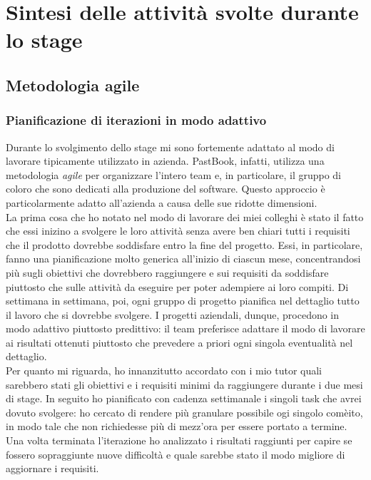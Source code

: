 \chapter{Sintesi delle attività svolte durante lo stage}
	\section{Metodologia agile}
		\subsection{Pianificazione di iterazioni in modo adattivo}
			Durante lo svolgimento dello stage mi sono fortemente adattato al modo di lavorare tipicamente utilizzato in azienda.
			PastBook, infatti, utilizza una metodologia \emph{agile} per organizzare l'intero team e, in particolare, il gruppo di coloro
			che sono dedicati alla produzione del software. Questo approccio è particolarmente adatto all'azienda a causa delle sue
			ridotte dimensioni.\\
			La prima cosa che ho notato nel modo di lavorare dei miei colleghi è stato il fatto che essi inizino a svolgere le loro
			attività senza avere ben chiari tutti i requisiti che il prodotto dovrebbe soddisfare entro la fine del progetto.
			Essi, in particolare, fanno una pianificazione molto generica all'inizio di ciascun mese, concentrandosi più sugli
			obiettivi che dovrebbero raggiungere e sui requisiti da soddisfare piuttosto che sulle attività da eseguire per poter
			adempiere ai loro compiti. Di settimana in settimana, poi, ogni gruppo di progetto pianifica nel dettaglio tutto il lavoro
			che si dovrebbe svolgere. I progetti aziendali, dunque, procedono in modo adattivo piuttosto predittivo: il team preferisce
			adattare il modo di lavorare ai risultati ottenuti piuttosto che prevedere a priori ogni singola eventualità nel dettaglio.\\
			Per quanto mi riguarda, ho innanzitutto accordato con i mio tutor quali sarebbero stati gli obiettivi e i requisiti minimi
			da raggiungere durante i due mesi di stage. In seguito ho pianificato con cadenza settimanale i singoli task che avrei
			dovuto svolgere: ho cercato di rendere più granulare possibile ogi singolo comèito, in modo tale che non richiedesse più di
			mezz'ora per essere portato a termine. Una volta terminata l'iterazione ho analizzato i risultati raggiunti per capire se
			fossero sopraggiunte nuove difficoltà e quale sarebbe stato il modo migliore di aggiornare i requisiti.

